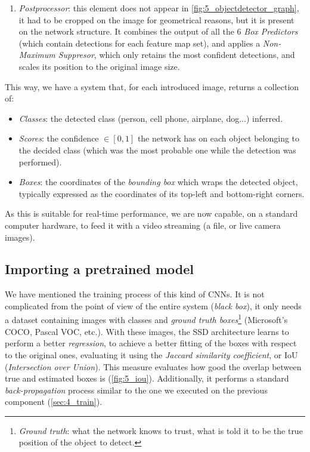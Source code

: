 \begin{enumerate}
			\item \emph{Postprocessor}: this element does not appear in \autoref{fig:5_objectdetector_graph}, it had to be cropped on the image for geometrical reasons, but it is present on the network structure. It combines the output of all the 6 \emph{Box Predictors} (which contain detections for each feature map set), and applies a \emph{Non-Maximum Suppresor}, which only retains the most confident detections, and scales its position to the original image size.
		\end{enumerate}
	
	This way, we have a system that, for each introduced image, returns a collection of:
	\begin{itemize}
		\item \emph{Classes}: the detected class (person, cell phone, airplane, dog...) inferred.
		\item \emph{Scores}: the confidence $\in [0,1]$ the network has on each object belonging to the decided class (which was the most probable one while the detection was performed).
		\item \emph{Boxes}: the coordinates of the \emph{bounding box} which wraps the detected object, typically expressed as the coordinates of its top-left and bottom-right corners.
	\end{itemize}
	
	As this is suitable for real-time performance, we are now capable, on a standard computer hardware, to feed it with a video streaming (a file, or live camera images).
	
	\subsection{Importing a pretrained model}
		We have mentioned the training process of this kind of CNNs. It is not complicated from the point of view of the entire system (\emph{black box}), it only needs a dataset containing images with classes and \emph{ground truth boxes}\footnote{\emph{Ground truth}: what the network knows to trust, what is told it to be the true position of the object to detect.} (Microsoft's COCO, Pascal VOC, etc.). With these images, the SSD architecture learns to perform a better \emph{regression}, to achieve a better fitting of the boxes with respect to the original ones, evaluating it using the \emph{Jaccard similarity coefficient}, or IoU (\emph{Intersection over Union}). This measure evaluates how good the overlap between true and estimated boxes is (\autoref{fig:5_iou}). Additionally, it performs a standard \emph{back-propagation} process similar to the one we executed on the previous component (\autoref{sec:4_train}).
		
